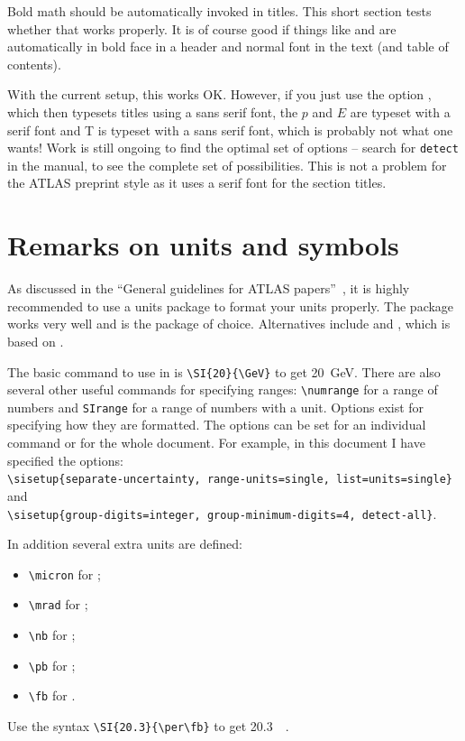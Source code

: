 Bold math should be automatically invoked in titles.
This short section tests whether that works properly.
It is of course good if things like \pT and \ET are automatically in bold face in
a header and normal font in the text (and table of contents).

With the current setup, this works OK. 
However, if you just use the option , which then typesets titles using a sans serif font,
the $p$ and $E$ are typeset with a serif font and \textsf{T} is typeset with a sans serif font,
which is probably not what one wants!
Work is still ongoing to find the optimal set of options
-- search for \texttt{detect} in the  manual, to see the complete set of possibilities.
This is not a problem for the ATLAS preprint style as it uses a serif font for the section titles.


\section{Remarks on units and symbols}

As discussed in the \enquote{General guidelines for ATLAS papers}~\cite{atlas-paper},
it is highly recommended to use a units package to format your units properly.
The package  works very well and is the package of choice.
Alternatives include  and ,
which is based on .

The basic command to use in  is \verb|\SI{20}{\GeV}| to get
\SI{20}{\GeV}. 
There are also several other useful commands for specifying ranges:
\verb|\numrange| for a range of numbers and \verb|SIrange| for a range of numbers with a unit. 
Options exist for specifying how they are formatted.
The options can be set for an individual command or for the whole document.
For example, in this document I have specified the options:\\
\verb|\sisetup{separate-uncertainty, range-units=single, list=units=single}|
and\\
\verb|\sisetup{group-digits=integer, group-minimum-digits=4, detect-all}|.

In addition several extra units are defined:
\begin{itemize}
\item \verb|\micron| for \si{\micron};
\item \verb|\mrad| for \si{\mrad};
\item \verb|\nb| for \si{\nb};
\item \verb|\pb| for \si{\pb};
\item \verb|\fb| for \si{\fb}.
\end{itemize}
Use the syntax \verb|\SI{20.3}{\per\fb}| to get \SI{20.3}{\per\fb}.

